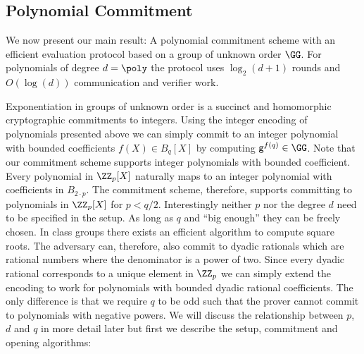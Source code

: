 \documentclass{article}
\theoremstyle{definition}
\begin{document}
\subsection{Polynomial Commitment}

We now present our main result: 
A polynomial commitment scheme with an efficient evaluation protocol based on a group of unknown order $\GG$. For polynomials of degree $d=\poly$ the protocol uses $\log_2(d+1)$ rounds and $O(\log(d))$ communication and verifier work.

Exponentiation in groups of unknown order is a succinct and homomorphic cryptographic commitments to integers.
Using the integer encoding of polynomials presented above we can simply commit to an integer polynomial with bounded coefficients $f(X)\in B_{q}[X]$ by computing $\gr{g}^{f(q)} \in \GG$. Note that our commitment scheme supports integer polynomials with bounded coefficient. Every polynomial in $\ZZ_p[X]$ naturally maps to an integer polynomial with coefficients in $B_{2\cdot p}$. The commitment scheme, therefore, supports committing to polynomials in $\ZZ_p[X]$ for $p<q/2$. Interestingly neither $p$ nor the degree $d$ need to be specified in the setup. As long as $q$ and ``big enough'' they can be freely chosen. In class groups there exists an efficient algorithm to compute square roots. The adversary can, therefore, also commit to dyadic rationals which are rational numbers where the denominator is a power of two. Since every dyadic rational corresponds to a unique element in $\ZZ_p$ we can simply extend the encoding to work for polynomials with bounded dyadic rational coefficients. The only difference is that we require $q$ to be odd such that the prover cannot commit to polynomials with negative powers. We will discuss the relationship between $p$, $d$ and $q$ in more detail later but first we describe the setup, commitment and opening algorithms:
\end{document}
